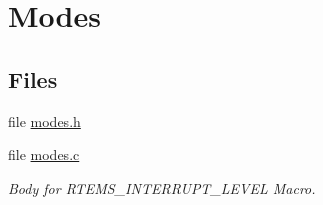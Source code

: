 \hypertarget{group__ClassicModes}{}\section{Modes}
\label{group__ClassicModes}
\subsection*{Files}
\begin{DoxyCompactItemize}
\item 
file \mbox{\hyperlink{modes_8h}{modes.\+h}}
\item 
file \mbox{\hyperlink{modes_8c}{modes.\+c}}
\begin{DoxyCompactList}\small\item\em Body for R\+T\+E\+M\+S\+\_\+\+I\+N\+T\+E\+R\+R\+U\+P\+T\+\_\+\+L\+E\+V\+EL Macro. \end{DoxyCompactList}\end{DoxyCompactItemize}
